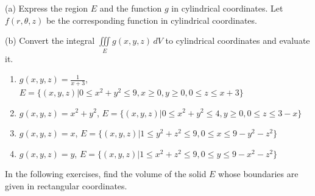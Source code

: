 \documentclass{exercises}
\begin{document}
(a) Express the region $E$ and the function $g$ in cylindrical coordinates. Let $f(r,\theta,z)$ be the corresponding function in cylindrical coordinates.


(b) Convert the integral $\underset{E}{\iiint}g(x,y,z)\,dV$ to cylindrical coordinates and evaluate it.

\begin{enumerate}[resume]
\item $g(x,y,z)=\frac{1}{x+3}$, $E=\{(x,y,z)|0\le x^{2}+y^{2}\le9,x\ge0,y\ge0,0\le z\le x+3\}$
\item $g(x,y,z)=x^{2}+y^{2}$, $E=\{(x,y,z)|0\le x^{2}+y^{2}\le4,y\ge0,0\le z\le3-x\}$
\item $g(x,y,z)=x$, $E=\{(x,y,z)|1\le y^{2}+z^{2}\le9,0\le x\le9-y^{2}-z^{2}\}$
\item $g(x,y,z)=y$, $E=\{(x,y,z)|1\le x^{2}+z^{2}\le9,0\le y\le9-x^{2}-z^{2}\}$
\end{enumerate}

In the following exercises, find the volume of the solid $E$ whose boundaries are given in rectangular coordinates.
\end{document}
